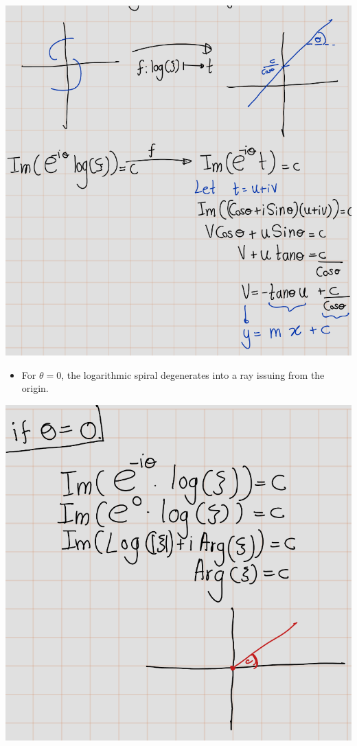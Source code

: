 \documentclass[
]{book}
\providecommand{\tightlist}{%
  \setlength{\itemsep}{0pt}\setlength{\parskip}{0pt}}
\theoremstyle{definition}
\theoremstyle{definition}
\theoremstyle{definition}
\theoremstyle{definition}
\theoremstyle{remark}
\begin{document}
\begin{center}\includegraphics[width=10.1in]{figures/Helical_Domain/fig1} \end{center}

\begin{itemize}
\tightlist
\item
  For \(\theta = 0\), the logarithmic spiral degenerates into a ray issuing from the origin.
\end{itemize}

\begin{center}\includegraphics[width=10.6in]{figures/Helical_Domain/fig2} \end{center}
\end{document}
